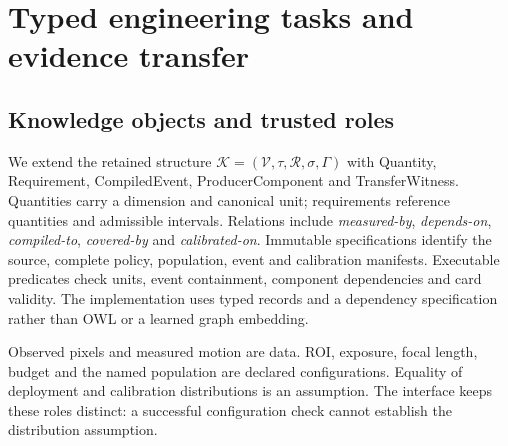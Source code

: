 \section{Typed engineering tasks and evidence transfer}\label{sec:r9-knowledge}
\subsection{Knowledge objects and trusted roles}
We extend the retained structure $\mathcal K=(\mathcal V,\tau,\mathcal R,\sigma,\Gamma)$ with Quantity, Requirement, CompiledEvent, ProducerComponent and TransferWitness. Quantities carry a dimension and canonical unit; requirements reference quantities and admissible intervals. Relations include \emph{measured-by}, \emph{depends-on}, \emph{compiled-to}, \emph{covered-by} and \emph{calibrated-on}. Immutable specifications identify the source, complete policy, population, event and calibration manifests. Executable predicates check units, event containment, component dependencies and card validity. The implementation uses typed records and a dependency specification rather than OWL or a learned graph embedding.

Observed pixels and measured motion are data. ROI, exposure, focal length, budget and the named population are declared configurations. Equality of deployment and calibration distributions is an assumption. The interface keeps these roles distinct: a successful configuration check cannot establish the distribution assumption.

